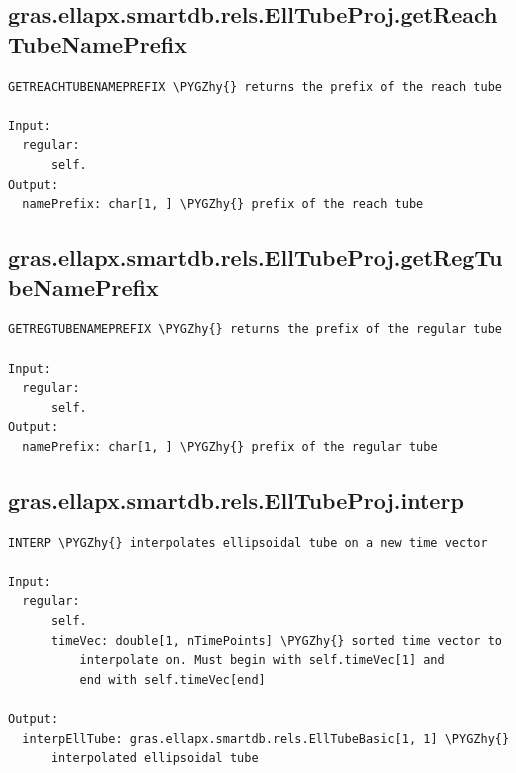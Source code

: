 \documentclass[letterpaper,10pt,english]{sphinxmanual}
\def\PYGZhy{\char`\-}
\begin{document}
\subsection{gras.ellapx.smartdb.rels.EllTubeProj.getReachTubeNamePrefix}
\label{chap_functions:gras-ellapx-smartdb-rels-elltubeproj-getreachtubenameprefix}
\begin{Verbatim}[commandchars=\\\{\}]
GETREACHTUBENAMEPREFIX \PYGZhy{} returns the prefix of the reach tube

Input:
  regular:
      self.
Output:
  namePrefix: char[1, ] \PYGZhy{} prefix of the reach tube
\end{Verbatim}


\subsection{gras.ellapx.smartdb.rels.EllTubeProj.getRegTubeNamePrefix}
\label{chap_functions:gras-ellapx-smartdb-rels-elltubeproj-getregtubenameprefix}
\begin{Verbatim}[commandchars=\\\{\}]
GETREGTUBENAMEPREFIX \PYGZhy{} returns the prefix of the regular tube

Input:
  regular:
      self.
Output:
  namePrefix: char[1, ] \PYGZhy{} prefix of the regular tube
\end{Verbatim}


\subsection{gras.ellapx.smartdb.rels.EllTubeProj.interp}
\label{chap_functions:gras-ellapx-smartdb-rels-elltubeproj-interp}
\begin{Verbatim}[commandchars=\\\{\}]
INTERP \PYGZhy{} interpolates ellipsoidal tube on a new time vector

Input:
  regular:
      self.
      timeVec: double[1, nTimePoints] \PYGZhy{} sorted time vector to
          interpolate on. Must begin with self.timeVec[1] and
          end with self.timeVec[end]

Output:
  interpEllTube: gras.ellapx.smartdb.rels.EllTubeBasic[1, 1] \PYGZhy{}
      interpolated ellipsoidal tube
\end{Verbatim}
\end{document}
